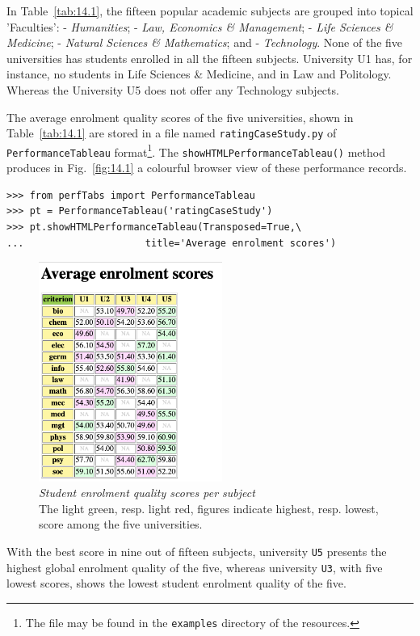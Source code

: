 In Table~\vref{tab:14.1}, the fifteen popular academic subjects are grouped into topical 'Faculties': - \emph{Humanities}; - \emph{Law, Economics \& Management}; - \emph{Life Sciences \& Medicine}; - \emph{Natural Sciences \& Mathematics}; and - \emph{Technology}. None of the five universities has students enrolled in all the fifteen subjects. University U1 has, for instance, no students in Life Sciences \& Medicine, and in Law and Politology. Whereas the University U5 does not offer any Technology subjects.

The average enrolment quality scores of the five universities, shown in Table~\vref{tab:14.1} are stored in a file named \texttt{ratingCaseStudy.py} of \texttt{PerformanceTableau} format\footnote{The file may be found in the \texttt{examples} directory of the \Digraph resources.}. The \texttt{showHTMLPerformanceTableau()}  method produces in Fig.~\vref{fig:14.1} a colourful browser view of these performance records. 
\begin{lstlisting}
>>> from perfTabs import PerformanceTableau
>>> pt = PerformanceTableau('ratingCaseStudy')
>>> pt.showHTMLPerformanceTableau(Transposed=True,\
...                     title='Average enrolment scores')
\end{lstlisting}
\begin{figure}[ht]
\sidecaption[t]
\includegraphics[width=6cm]{Figures/14-1-enrolmentScores.png}
\caption[Student enrolment quality scores per subject]{\emph{Student enrolment quality scores per subject}\\ The light green, resp. light red, figures indicate highest, resp. lowest, score among the five universities.}
\label{fig:14.1}       %
\end{figure}

With the best score in nine out of fifteen subjects, university \texttt{U5} presents the highest global enrolment quality of the five, whereas university \texttt{U3}, with five lowest scores, shows the lowest student enrolment quality of the five.

